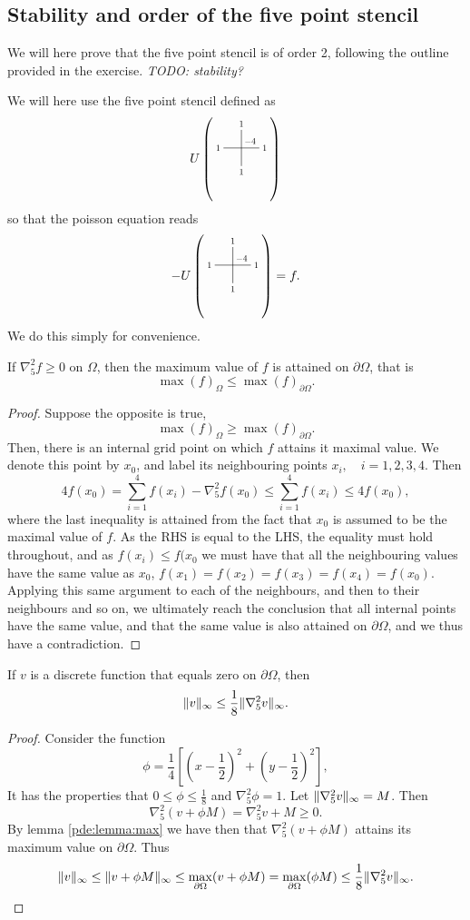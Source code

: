 \subsection{Stability and order of the five point stencil}
We will here prove that the five point stencil is of order 2, following the outline provided in the exercise.
\emph{TODO: stability?}

We will here use the five point stencil defined as
$$
U \left(\crossStencil{1}{1}{1}{1}{-4}\right)
$$
so that the poisson equation reads
$$
- U \left(\crossStencil{1}{1}{1}{1}{-4}\right) = f.
$$
We do this simply for convenience.\\

\begin{lemma}\label{pde:lemma:max}
If $\nabla_5^2 f \geq 0$ on $\Omega$, then the maximum value of $f$ is attained on $\partial \Omega$, that is
$$
\max(f)_\Omega \leq \max(f)_{\partial \Omega}.
$$
\end{lemma}
\begin{proof}
Suppose the opposite is true,
$$
\max(f)_\Omega \geq \max(f)_{\partial \Omega}.
$$
Then, there is an internal grid point on which $f$ attains it maximal value.
We denote this point by $x_0$, and label its neighbouring points $x_i,\quad i = 1,2,3,4$.
Then
$$
4f(x_0) = \sum_{i=1}^4 f(x_i) - \nabla_5^2 f(x_0) \leq \sum_{i=1}^4 f(x_i) \leq 4 f(x_0),
$$
where the last inequality is attained from the fact that $x_0$ is assumed to be the maximal value of $f$.
As the RHS is equal to the LHS, the equality must hold throughout, and as $f(x_i) \leq f(x_0$ we must have that all the neighbouring values have the same value as $x_0$, $f(x_1) = f(x_2) = f(x_3) = f(x_4) = f(x_0)$.
Applying this same argument to each of the neighbours, and then to their neighbours and so on, we ultimately reach the conclusion that all internal points have the same value, and that the same value is also attained on $\partial \Omega$, and we thus have a contradiction.
\end{proof}

\begin{lemma}\label{pde:lemma:bound}
If $v$ is a discrete function that equals zero on $\partial \Omega$, then
$$
\lVert v \rVert_\infty \leq \frac18 \lVert \nabla_5^2 v \rVert_\infty.
$$
\end{lemma}
\begin{proof}
Consider the function
$$
\phi = \frac14 [ (x-\frac12)^2 + (y-\frac12)^2 ],
$$
It has the properties that $0 \leq \phi \leq \frac18$ and $\nabla_5^2 \phi = 1$.
Let $\lVert \nabla_5^2 v \rVert_\infty = M$.
Then
$$
\nabla_5^2 (v + \phi M) = \nabla_5^2 v +  M \geq 0.
$$
By lemma \ref{pde:lemma:max} we have then that $\nabla_5^2 (v + \phi M)$ attains its maximum value on $\partial \Omega$.
Thus
$$
\lVert v \rVert_\infty
\leq \lVert v + \phi M \rVert_\infty
\leq \max_{\partial \Omega}(v + \phi M)
= \max_{\partial\Omega} (\phi M)
\leq \frac18 \lVert \nabla_5^2 v \rVert_\infty.
$$
\end{proof}

